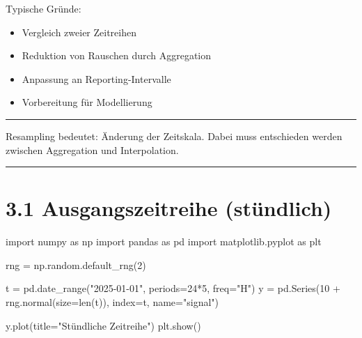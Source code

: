 \documentclass[
  ngerman,
  letterpaper,
  DIV=11]{scrreprt}
\newenvironment{Shaded}{\begin{snugshade}}{\end{snugshade}}
\newcommand{\BuiltInTok}[1]{\textcolor[rgb]{0.00,0.23,0.31}{#1}}
\newcommand{\DecValTok}[1]{\textcolor[rgb]{0.68,0.00,0.00}{#1}}
\newcommand{\ImportTok}[1]{\textcolor[rgb]{0.00,0.46,0.62}{#1}}
\newcommand{\NormalTok}[1]{\textcolor[rgb]{0.00,0.23,0.31}{#1}}
\newcommand{\OperatorTok}[1]{\textcolor[rgb]{0.37,0.37,0.37}{#1}}
\newcommand{\StringTok}[1]{\textcolor[rgb]{0.13,0.47,0.30}{#1}}
\providecommand{\tightlist}{%
  \setlength{\itemsep}{0pt}\setlength{\parskip}{0pt}}
\begin{document}
Typische Gründe:

\begin{itemize}
\tightlist
\item
  Vergleich zweier Zeitreihen
\item
  Reduktion von Rauschen durch Aggregation
\item
  Anpassung an Reporting-Intervalle
\item
  Vorbereitung für Modellierung
\end{itemize}

\begin{center}\rule{0.5\linewidth}{0.5pt}\end{center}

\begin{tcolorbox}[enhanced jigsaw, titlerule=0mm, title=\textcolor{quarto-callout-note-color}{\faInfo}\hspace{0.5em}{Merke}, bottomrule=.15mm, opacityback=0, colbacktitle=quarto-callout-note-color!10!white, coltitle=black, opacitybacktitle=0.6, colframe=quarto-callout-note-color-frame, toprule=.15mm, leftrule=.75mm, arc=.35mm, rightrule=.15mm, breakable, bottomtitle=1mm, colback=white, toptitle=1mm, left=2mm]

Resampling bedeutet: Änderung der Zeitskala. Dabei muss entschieden
werden zwischen Aggregation und Interpolation.

\end{tcolorbox}

\begin{center}\rule{0.5\linewidth}{0.5pt}\end{center}

\section{3.1 Ausgangszeitreihe
(stündlich)}\label{ausgangszeitreihe-stuxfcndlich}

\begin{Shaded}
\begin{Highlighting}[]
\ImportTok{import}\NormalTok{ numpy }\ImportTok{as}\NormalTok{ np}
\ImportTok{import}\NormalTok{ pandas }\ImportTok{as}\NormalTok{ pd}
\ImportTok{import}\NormalTok{ matplotlib.pyplot }\ImportTok{as}\NormalTok{ plt}

\NormalTok{rng }\OperatorTok{=}\NormalTok{ np.random.default\_rng(}\DecValTok{2}\NormalTok{)}

\NormalTok{t }\OperatorTok{=}\NormalTok{ pd.date\_range(}\StringTok{"2025{-}01{-}01"}\NormalTok{, periods}\OperatorTok{=}\DecValTok{24}\OperatorTok{*}\DecValTok{5}\NormalTok{, freq}\OperatorTok{=}\StringTok{"H"}\NormalTok{)}
\NormalTok{y }\OperatorTok{=}\NormalTok{ pd.Series(}\DecValTok{10} \OperatorTok{+}\NormalTok{ rng.normal(size}\OperatorTok{=}\BuiltInTok{len}\NormalTok{(t)), index}\OperatorTok{=}\NormalTok{t, name}\OperatorTok{=}\StringTok{"signal"}\NormalTok{)}

\NormalTok{y.plot(title}\OperatorTok{=}\StringTok{"Stündliche Zeitreihe"}\NormalTok{)}
\NormalTok{plt.show()}
\end{Highlighting}
\end{Shaded}
\end{document}
